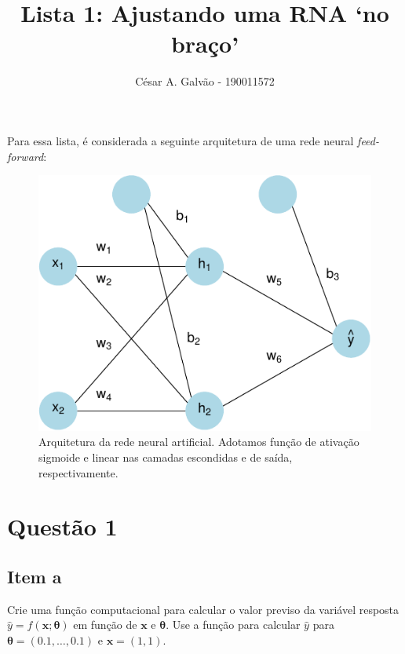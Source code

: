 \documentclass[
  a4paperpaper,
]{article}
\title{Lista 1: Ajustando uma RNA `no braço'}
\author{César A. Galvão - 190011572}
\date{}
\begin{document}
\maketitle

Para essa lista, é considerada a seguinte arquitetura de uma rede neural
\emph{feed-forward}:

\begin{figure}[H]

{\centering \includegraphics{lista1-resolucao_files/figure-pdf/figf-arquitetura-rede-1.pdf}

}

\caption{Arquitetura da rede neural artificial. Adotamos função de
ativação sigmoide e linear nas camadas escondidas e de saída,
respectivamente.}

\end{figure}%

\section{Questão 1}\label{questuxe3o-1}

\subsection{Item a}\label{item-a}

Crie uma função computacional para calcular o valor previso da variável
resposta \(\hat{y} = f(\boldsymbol{x}; \boldsymbol{\theta})\) em função
de \(\boldsymbol{x}\) e \(\boldsymbol{\theta}\). Use a função para
calcular \(\hat{y}\) para \(\boldsymbol{\theta} = (0.1, \dots , 0.1)\) e
\(\boldsymbol{x} = (1, 1)\).
\end{document}
